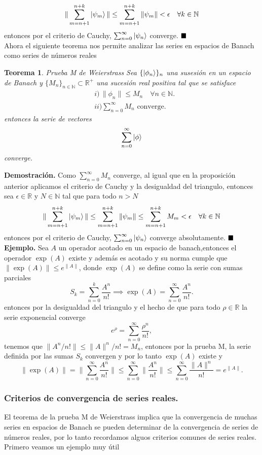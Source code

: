 \documentclass[letterpaper]{book}
\newtheorem{teorema}{Teorema}[section]
\newcommand{\nat}{\ensuremath{ \mathbb N }}
\newcommand{\eje}{{\noindent \sc \textbf{Ejemplo. }}}
\newcommand{\dem}{{\noindent \sc \textbf{Demostraci\'on. }}}
\newcommand{\QED}{\ensuremath{\hspace*{0em plus 1fill}\blacksquare}}
\newcommand{\re}{\ensuremath{\mathbb R }}
\begin{document}
\[
 \|\sum_{m=n+1}^{n+k}\ket{\psi_m}\|\leq \sum_{m=n+1}^{n+k}\|\psi_m\|<\epsilon\quad\forall k\in\nat
\]
entonces por el criterio de Cauchy, \(\sum_{n=0}^{\infty}\ket{\psi_n}\) converge.
\QED\\
Ahora el siguiente teorema nos permite analizar las series en espacios de Banach como series de números reales
\begin{teorema}{Prueba M de Weierstrass}
  Sea \(\{\ket{\phi_n}\}_n\) una susesión en un espacio de Banach y \(\{M_n\}_{n\in\nat}\subset\re^{+}\) una sucesión real positiva tal que se satisface
  \begin{align*}
    &i)\,\|\phi_n\|\leq M_n \quad\forall n\in\nat.\\
    &ii)\sum_{n=0}^{\infty}M_n\text{ converge}.
    \end{align*}
  entonces la serie de vectores
  \[
    \sum_{n=0}^{\infty}\ket{\phi}
  \]
  converge.
\end{teorema}
\dem Como \(\sum_{n=0}^{\infty}M_n\) converge, al igual que en la proposición anterior aplicamos el criterio de Cauchy y la desigualdad del triangulo, entonces sea \(\epsilon\in\re\) y \(N\in\nat\) tal que para todo \(n>N\)
\[
 \|\sum_{m=n+1}^{n+k}\ket{\psi_m}\|\leq \sum_{m=n+1}^{n+k}\|\psi_m\|\leq \sum_{m=n+1}^{n+k}M_m<\epsilon\quad\forall k\in\nat
\]
entonces por el criterio de Cauchy, \(\sum_{n=0}^{\infty}\ket{\psi_n}\) converge absolutamente.
\QED\\
\eje Sea \(A\) un operador acotado en un espacio de banach,entonces el operador \(\exp(A)\) existe y además es acotado y su norma cumple que \(\|\exp(A)\|\leq e^{\|A\|}\), donde \(\exp(A)\) se define como la serie con sumas parciales
\[
S_k=\sum_{n=0}^{k}\frac{A^n}{n!}\implies\exp(A)=\sum_{n=0}^{\infty}\frac{A^n}{n!}.
\]
entonces por la desigualdad del triangulo y el hecho de que para todo \(\rho\in\re\) la serie exponencial converge
\[
e^{\rho}=\sum_{n=0}^{\infty}\frac{\rho^n}{n!},
\]
tenemos que \(\|A^n/n!\|\leq\|A\|^n/n!=M_n\), entonces por la prueba M, la serie definida por las sumas \(S_k\) convergen y por lo tanto \(\exp(A)\) existe y
\[
\|\exp(A)\|=\Big\|\sum_{n=0}^{\infty}\frac{A^n}{n!}\Big\|\leq\sum_{n=0}^{\infty}\Big\|\frac{A^n}{n!}\Big\|\leq\sum_{n=0}^{\infty}\frac{\|A\|^n}{n!}=e^{\|A\|}.
\]

\subsubsection{Criterios de convergencia de series reales.}
\noindent El teorema de la prueba M de Weierstrass implica que la convergencia de muchas series en espacios de Banach se pueden determinar de la convergencia de series de números reales, por lo tanto recordamos alguos criterios comunes de series reales. Primero veamos un ejemplo muy útil
\end{document}
